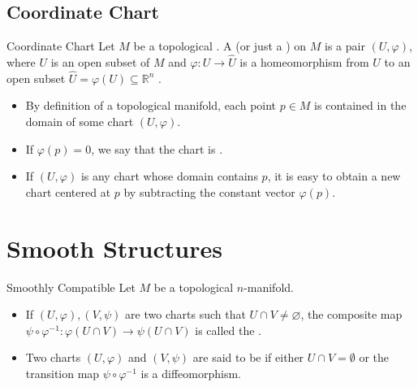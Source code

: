 \documentclass[../main.tex]{subfiles}
\begin{document}
\subsection{Coordinate Chart}

\begin{definition}{Coordinate Chart}{}
    Let $M$ be a topological . A  (or just a ) on $M$ is a pair $(U, \varphi)$, where $U$ is an open subset of $M$ and $\varphi: U \to \hat{U}$ is a homeomorphism from $U$ to an open subset $\hat{U} = \varphi(U) \subseteq \mathbb{R}^n$ . 
    
\end{definition}

\begin{remark}
    \begin{itemize}
        \item By definition of a topological manifold, each point $p \in M$ is contained in the domain of some chart $(U, \varphi)$. 
        \item If $\varphi(p) = 0$, we say that the chart is .
        \item  If $(U, \varphi)$ is any chart whose domain contains $p$, it is easy to obtain a new chart centered at $p$ by subtracting the constant vector $\varphi(p)$.
    \end{itemize}
    
\end{remark}

\section{Smooth Structures}

\begin{definition}{Smoothly Compatible}{}
    Let $M$ be a topological $n$-manifold. 
    \begin{itemize}
        \item If $(U, \varphi), (V, \psi)$ are two charts such that $U \cap V \neq \varnothing$, the composite map $\psi \circ \varphi^{-1}: \varphi(U \cap V) \to \psi(U \cap V)$ is called the .
        \item  Two charts $(U, \varphi)$ and $(V, \psi)$ are said to be  if either $U \cap V = \emptyset$ or the transition map $\psi \circ \varphi^{-1}$ is a diffeomorphism. 
    \end{itemize}
  
    
\end{definition}
\end{document}
